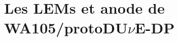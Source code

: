     \section{Les LEMs et anode de WA105/\texorpdfstring{protoDU$\nu$E}{protoDUNE}-DP}
%        
%        
